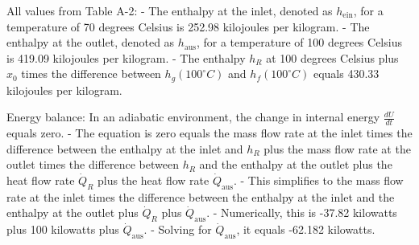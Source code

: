 All values from Table A-2:
- The enthalpy at the inlet, denoted as \( h_{\text{ein}} \), for a temperature of 70 degrees Celsius is 252.98 kilojoules per kilogram.
- The enthalpy at the outlet, denoted as \( h_{\text{aus}} \), for a temperature of 100 degrees Celsius is 419.09 kilojoules per kilogram.
- The enthalpy \( h_R \) at 100 degrees Celsius plus \( x_0 \) times the difference between \( h_g(100^\circ C) \) and \( h_f(100^\circ C) \) equals 430.33 kilojoules per kilogram.

Energy balance:
In an adiabatic environment, the change in internal energy \( \frac{dU}{dt} \) equals zero.
- The equation is zero equals the mass flow rate at the inlet times the difference between the enthalpy at the inlet and \( h_R \) plus the mass flow rate at the outlet times the difference between \( h_R \) and the enthalpy at the outlet plus the heat flow rate \( \dot{Q}_R \) plus the heat flow rate \( \dot{Q}_{\text{aus}} \).
- This simplifies to the mass flow rate at the inlet times the difference between the enthalpy at the inlet and the enthalpy at the outlet plus \( \dot{Q}_R \) plus \( \dot{Q}_{\text{aus}} \).
- Numerically, this is -37.82 kilowatts plus 100 kilowatts plus \( \dot{Q}_{\text{aus}} \).
- Solving for \( \dot{Q}_{\text{aus}} \), it equals -62.182 kilowatts.